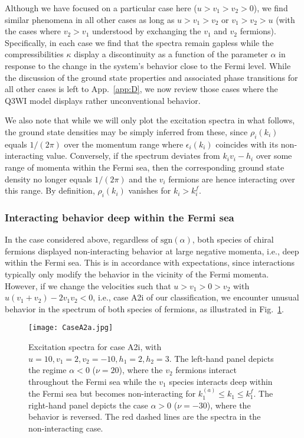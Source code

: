 \documentclass[aps,pra,
superscriptaddress,
reprint,twocolumn,preprintnumbers,
amsmath,amssymb,
nofootinbib]{revtex4-1}
\begin{document}
Although we have focused on a particular case here ($u>v_1>v_2>0$), we find similar phenomena in all other cases as long as $u > v_1 > v_2$ or $v_1 > v_2 > u$ (with the cases where $v_2 > v_1$ understood by exchanging the $v_1$ and $v_2$ fermions). Specifically, in each case we find that the spectra remain gapless while the compressibilities $\kappa$ display a discontinuity as a function of the parameter $\alpha$ in response to the change in the system's behavior close to the Fermi level. While the discussion of the ground state properties and associated phase transitions for all other cases is left to App.~\ref{app:D}, we now review those cases where the Q3WI model displays rather unconventional behavior.

We also note that while we will only plot the excitation spectra in what follows, the ground state densities may be simply inferred from these, since $\rho_i(k_i)$ equals $1/(2\pi)$ over the momentum range where $\epsilon_i(k_i)$ coincides with its non-interacting value. Conversely, if the spectrum deviates from $k_i v_i - h_i$ over some range of momenta within the Fermi sea, then the corresponding ground state density no longer equals $1/(2\pi)$ and the $v_i$ fermions are hence interacting over this range. By definition, $\rho_i(k_i)$ vanishes for $k_i > k_i^f$.

\subsubsection*{Interacting behavior deep within the Fermi sea}

In the case considered above, regardless of $\text{sgn}(\alpha)$, both species of chiral fermions displayed non-interacting behavior at large negative momenta, i.e., deep within the Fermi sea. This is in accordance with expectations, since interactions typically only modify the behavior in the vicinity of the Fermi momenta. However, if we change the velocities such that $u > v_1 > 0 > v_2$ with $u(v_1 + v_2) - 2 v_1 v_2 < 0$, i.e., case A2i of our classification, we encounter unusual behavior in the spectrum of both species of fermions, as illustrated in Fig.~\ref{fig:02}.
 	\begin{figure}[t]
    \texttt{[image: CaseA2a.jpg]}
    \centering
    \caption{\label{fig:02} Excitation spectra for case A2i, with $u = 10,v_1 = 2,v_2 = -10,h_1 = 2,h_2 = 3$. The left-hand panel depicts the regime $\alpha<0$ ($\nu = 20$), where the $v_2$ fermions interact throughout the Fermi sea while the $v_1$ species interacts deep within the Fermi sea but becomes non-interacting for $k_1^{(a)}\leq k_1 \leq k_1^{f}$. The right-hand panel depicts the case $\alpha>0$ ($\nu = -30$), where the behavior is reversed. The red dashed lines are the spectra in the non-interacting case.}
    \end{figure}
\end{document}
